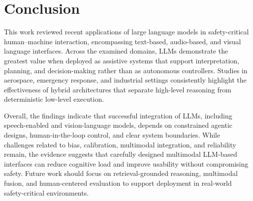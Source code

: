 \section{Conclusion}
\label{sec:conclusion}

This work reviewed recent applications of large language models in safety-critical human–machine interaction, encompassing text-based, audio-based, and visual language interfaces. 
Across the examined domains, LLMs demonstrate the greatest value when deployed as assistive systems that support interpretation, planning, and decision-making rather than as autonomous controllers. 
Studies in aerospace, emergency response, and industrial settings consistently highlight the effectiveness of hybrid architectures that separate high-level reasoning from deterministic low-level execution.

Overall, the findings indicate that successful integration of LLMs, including speech-enabled and vision-language models, depends on constrained agentic designs, human-in-the-loop control, and clear system boundaries. 
While challenges related to bias, calibration, multimodal integration, and reliability remain, the evidence suggests that carefully designed multimodal LLM-based interfaces can reduce cognitive load and improve usability without compromising safety. 
Future work should focus on retrieval-grounded reasoning, multimodal fusion, and human-centered evaluation to support deployment in real-world safety-critical environments.
